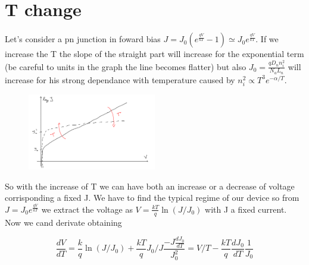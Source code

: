 \centering
{}
\raggedright

\centering
{}
\raggedright

\section{T change}
Let's consider a pn junction in foward bias $J=J_0(e^{\frac{qV}{kT}}-1)\simeq J_0e^{\frac{qV}{kT}}$. If we increase the T the slope of the straight part will increase for the exponential term (be careful to units in the graph the line becomes flatter) but also $J_0=\frac{qD_nn_i^2}{N_aL_n}$ will increase for his strong dependance with temperature caused by $n_i^2\propto T^3e^{-\alpha/T}$.

\begin{figure}
\includegraphics[width=0.5\textwidth]{JwithT.png}
\end{figure}

So with the increase of T we can have both an increase or a decrease of voltage corrisponding a fixed J. We have to find the typical regime of our device so from $J=J_0e^{\frac{qV}{kT}}$ we extract the voltage as $V=\frac{kT}{q}\ln(J/J_0)$ with J a fixed current. Now we cand derivate obtaining

\begin{equation}
\frac{dV}{dT}= \frac{k}{q}\ln(J/J_0)+\frac{kT}{q}J_0/J \frac{-J \frac{dJ_0}{dT}}{J_0^2}=V/T-\frac{kT}{q}\frac{dJ_0}{dT}\frac{1}{J_0}
\end{equation}

